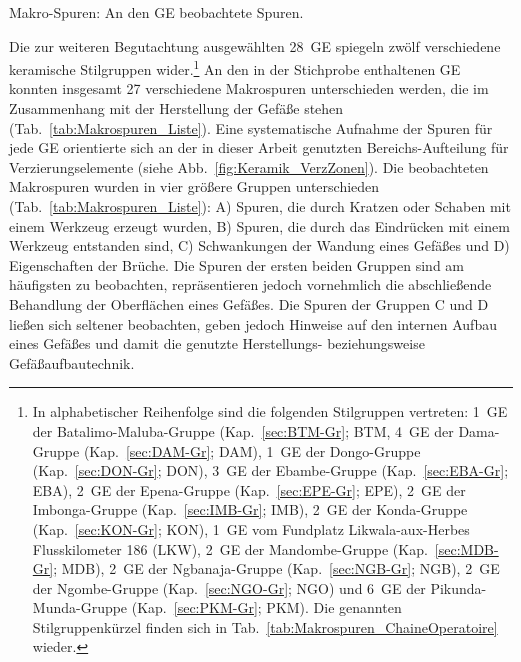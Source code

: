 \begin{multicols}{2}
\begin{table}[tb]
	\centering
	
	\caption{Makro-Spuren: An den GE beobachtete Spuren.}
	\label{tab:Makrospuren_Liste}
\end{table}

\vspace{1.5em}
\noindent Die zur weiteren Begutachtung ausgewählten 28~GE spiegeln zwölf verschiedene keramische Stilgruppen wider.\footnote{In alphabetischer Reihenfolge sind die folgenden Stilgruppen vertreten: 1~GE der Batalimo-Maluba-Gruppe (Kap.~\ref{sec:BTM-Gr}; BTM, 4~GE der Dama-Gruppe (Kap.~\ref{sec:DAM-Gr}; DAM), 1~GE der Dongo-Gruppe (Kap.~\ref{sec:DON-Gr}; DON), 3~GE der Ebambe-Gruppe (Kap.~\ref{sec:EBA-Gr}; EBA), 2~GE der Epena-Gruppe (Kap.~\ref{sec:EPE-Gr}; EPE), 2~GE der Imbonga-Gruppe (Kap.~\ref{sec:IMB-Gr}; IMB), 2~GE der Konda-Gruppe (Kap.~\ref{sec:KON-Gr}; KON), 1~GE vom Fundplatz \mbox{Likwala}-\mbox{aux}-\mbox{Herbes} Flusskilometer 186 (LKW), 2~GE der Mandombe-Gruppe (Kap.~\ref{sec:MDB-Gr}; MDB), 2~GE der Ngbanaja-Gruppe (Kap.~\ref{sec:NGB-Gr}; NGB), 2~GE der Ngombe-Gruppe (Kap.~\ref{sec:NGO-Gr}; NGO) und 6~GE der Pikunda-Munda-Gruppe (Kap.~\ref{sec:PKM-Gr}; PKM). Die genannten Stilgruppenkürzel finden sich in Tab.~\ref{tab:Makrospuren_ChaineOperatoire} wieder.\label{ftn:StilGrKurzel_UntersuchungHerstetellungstechnik}} An den in der Stichprobe enthaltenen GE konnten insgesamt 27 verschiedene Makrospuren unterschieden werden, die im Zusammenhang mit der Herstellung der Gefäße stehen (Tab.~\ref{tab:Makrospuren_Liste}). Eine systematische Aufnahme der Spuren für jede GE orientierte sich an der in dieser Arbeit genutzten Bereichs-Aufteilung für Verzierungselemente (siehe Abb.~\ref{fig:Keramik_VerzZonen}). Die beobachteten Makrospuren wurden in vier größere Gruppen unterschieden (Tab.~\ref{tab:Makrospuren_Liste}): A) Spuren, die durch Kratzen oder Schaben mit einem Werkzeug erzeugt wurden, B) Spuren, die durch das Eindrücken mit einem Werkzeug entstanden sind, C) Schwankungen der Wandung eines Gefäßes und D) Eigenschaften der Brüche. Die Spuren der ersten beiden Gruppen sind am häufigsten zu beobachten, repräsentieren jedoch vornehmlich die abschließende Behandlung der Oberflächen eines Gefäßes. Die Spuren der Gruppen C und D ließen sich seltener beobachten, geben jedoch Hinweise auf den internen Aufbau eines Gefäßes und damit die genutzte Herstellungs- beziehungsweise Gefäßaufbautechnik.


\end{multicols}
